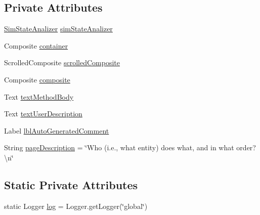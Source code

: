 \subsection*{Private Attributes}
\begin{DoxyCompactItemize}
\item 
\hyperlink{classit_1_1isislab_1_1masonhelperdocumentation_1_1analizer_1_1_sim_state_analizer}{Sim\-State\-Analizer} \hyperlink{classit_1_1isislab_1_1masonhelperdocumentation_1_1mason_1_1wizards_1_1_i___start_information_page_a6ea81365c2866cdd6f22cc660f7ed10c}{sim\-State\-Analizer}
\item 
Composite \hyperlink{classit_1_1isislab_1_1masonhelperdocumentation_1_1mason_1_1wizards_1_1_i___start_information_page_ae9856c6dd582204ec11d79886488fe94}{container}
\item 
Scrolled\-Composite \hyperlink{classit_1_1isislab_1_1masonhelperdocumentation_1_1mason_1_1wizards_1_1_i___start_information_page_a78967a339694c8dd82848006bf6526b6}{scrolled\-Composite}
\item 
Composite \hyperlink{classit_1_1isislab_1_1masonhelperdocumentation_1_1mason_1_1wizards_1_1_i___start_information_page_a4ab7b99c568dbe299dfcd34acb6ad97c}{composite}
\item 
Text \hyperlink{classit_1_1isislab_1_1masonhelperdocumentation_1_1mason_1_1wizards_1_1_i___start_information_page_a03f14d0a5df3cc1a27520083646630c5}{text\-Method\-Body}
\item 
Text \hyperlink{classit_1_1isislab_1_1masonhelperdocumentation_1_1mason_1_1wizards_1_1_i___start_information_page_a5b9b23fd18d352b235614b6bdfd23477}{text\-User\-Description}
\item 
Label \hyperlink{classit_1_1isislab_1_1masonhelperdocumentation_1_1mason_1_1wizards_1_1_i___start_information_page_a71b48bb46faed54b4236b3d52a074580}{lbl\-Auto\-Generated\-Comment}
\item 
String \hyperlink{classit_1_1isislab_1_1masonhelperdocumentation_1_1mason_1_1wizards_1_1_i___start_information_page_ad56316645cf5cdb2e9cca9fe28d33420}{page\-Description} = \char`\"{}Who (i.\-e., what entity) does what, and in what order?\textbackslash{}n\char`\"{}
\end{DoxyCompactItemize}
\subsection*{Static Private Attributes}
\begin{DoxyCompactItemize}
\item 
static Logger \hyperlink{classit_1_1isislab_1_1masonhelperdocumentation_1_1mason_1_1wizards_1_1_i___start_information_page_a2963ee0aa71a0baa8d0a1e9f6d23ffe8}{log} = Logger.\-get\-Logger(\char`\"{}global\char`\"{})
\end{DoxyCompactItemize}


